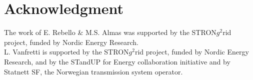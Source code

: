 \documentclass[conference]{IEEEtran}
\begin{document}
\section*{Acknowledgment}
The work of E. Rebello \& M.S. Almas was supported by the STRON$g^{2}$rid project, funded by Nordic Energy Research.\\
L. Vanfretti is supported by the STRON$g^{2}$rid project, funded by Nordic Energy Research, and by the STandUP for Energy collaboration initiative and by Statnett SF, the Norwegian transmission system operator.

%
%
%
\end{document}
